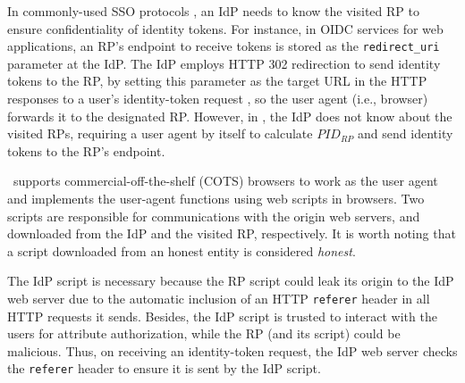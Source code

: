 
In commonly-used SSO protocols \cite{OpenIDConnect,rfc6749, SAML, SAMLIdentifier},
an IdP needs to know the visited RP to ensure confidentiality of identity tokens. For instance, in OIDC services for web applications, an RP's endpoint to receive tokens is stored as the \verb+redirect_uri+ parameter at the IdP.
The IdP employs HTTP 302 redirection to send identity tokens to the RP, by setting this parameter as the target URL in the HTTP responses to a user's identity-token request \cite{OpenIDConnect}, so the user agent (i.e., browser) forwards it to the designated RP.
However, in \usso, the IdP does not know about the visited RPs, requiring a user agent by itself to calculate $PID_{RP}$ and send identity tokens to the RP's endpoint.

\usso\ supports commercial-off-the-shelf (COTS) browsers to work as the user agent and implements the user-agent functions using web scripts in browsers. Two scripts are responsible for communications with the origin web servers,
 and downloaded from the IdP and the visited RP, respectively. It is worth noting that a script downloaded from an honest entity is considered \emph{honest}.

The IdP script is necessary because the RP script could leak its origin to the IdP web server due to the automatic inclusion of an HTTP \verb+referer+ header in all HTTP requests it sends.
Besides, the IdP script is trusted to interact with the users for attribute authorization,
  while the RP (and its script) could be malicious.
Thus, on receiving an identity-token request, the IdP web server checks the \verb+referer+ header to ensure it is sent by the IdP script.

